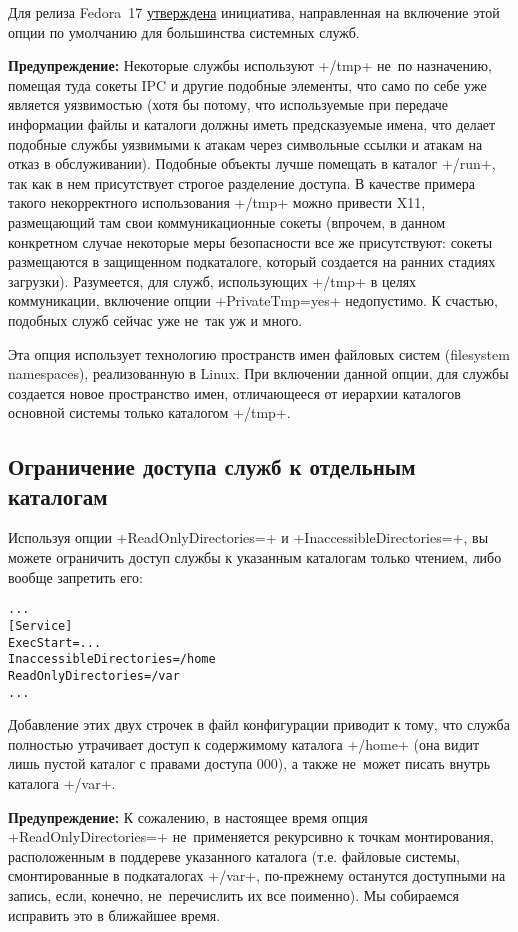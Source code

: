 \documentclass[10pt,oneside,a4paper]{article}
\newenvironment{caveat}[1][]{\smallskip\par\textbf{Предупреждение#1: }}%
	{\smallskip\par}
\begin{document}
Для релиза Fedora~17
\href{https://fedoraproject.org/wiki/Features/ServicesPrivateTmp}{утверждена}
инициатива, направленная на включение этой опции по умолчанию для большинства
системных служб.

\begin{caveat}
Некоторые службы используют +/tmp+ не~по назначению,
помещая туда сокеты IPC и другие подобные элементы, что само по себе уже
является уязвимостью (хотя бы потому, что используемые при передаче информации
файлы и каталоги должны иметь предсказуемые имена, что делает подобные службы
уязвимыми к атакам через символьные ссылки и атакам на отказ в обслуживании).
Подобные объекты лучше помещать в каталог +/run+, так как в нем присутствует
строгое разделение доступа. В качестве примера такого некорректного
использования +/tmp+ можно привести X11, размещающий там свои коммуникационные
сокеты (впрочем, в данном конкретном случае некоторые меры безопасности все же
присутствуют: сокеты размещаются в защищенном подкаталоге, который создается на
ранних стадиях загрузки). Разумеется, для служб, использующих +/tmp+ в целях
коммуникации, включение опции +PrivateTmp=yes+ недопустимо. К счастью, подобных
служб сейчас уже не~так уж и много.
\end{caveat}

Эта опция использует технологию пространств имен файловых систем (filesystem
namespaces), реализованную в Linux. При включении данной опции, для службы
создается новое пространство имен, отличающееся от иерархии каталогов основной
системы только каталогом +/tmp+.

\subsection{Ограничение доступа служб к отдельным каталогам}

Используя опции +ReadOnlyDirectories=+ и +InaccessibleDirectories=+, вы можете
ограничить доступ службы к указанным каталогам только чтением, либо вообще
запретить его:
\begin{Verbatim}
...
[Service]
ExecStart=...
InaccessibleDirectories=/home
ReadOnlyDirectories=/var
...
\end{Verbatim}
Добавление этих двух строчек в файл конфигурации приводит к тому, что служба
полностью утрачивает доступ к содержимому каталога +/home+ (она видит лишь
пустой каталог с правами доступа 000), а также не~может писать внутрь каталога
+/var+.

\begin{caveat}
К сожалению, в настоящее время опция +ReadOnlyDirectories=+ не~применяется
рекурсивно к точкам монтирования, расположенным в поддереве указанного каталога
(т.е. файловые системы, смонтированные в подкаталогах +/var+, по-прежнему
останутся доступными на запись, если, конечно, не~перечислить их все поименно).
Мы собираемся исправить это в ближайшее время.
\end{caveat}
\end{document}

